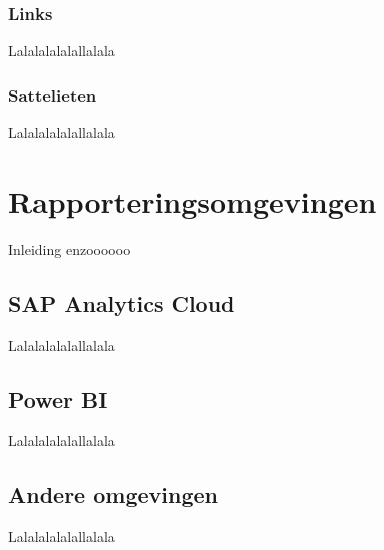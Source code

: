 \subsubsection{Links}
Lalalalalalallalala

\subsubsection{Sattelieten}
Lalalalalalallalala

\section{Rapporteringsomgevingen}
\label{sec:omgeving}
Inleiding enzoooooo

\subsection{SAP Analytics Cloud}
Lalalalalalallalala

\subsection{Power BI}
Lalalalalalallalala

\subsection{Andere omgevingen}
Lalalalalalallalala





